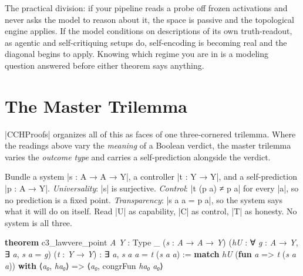 \documentclass{memoir}
\begin{document}
The practical division: if your pipeline reads a probe off frozen activations
and never asks the model to reason about it, the space is passive and the
topological engine applies. If the model conditions on descriptions of its own
truth-readout, as agentic and self-critiquing setups do, self-encoding is
becoming real and the diagonal begins to apply. Knowing which regime you are in
is a modeling question answered before either theorem says anything.



\section{The Master Trilemma}\label{Two--Schemas--of--Impossibility-005F-005F-005F--Machine--Checked--Limits--of--Trustworthy--Machine--Learning-005F-005F-005F--and--Why--They--Tighten--with--Capability----Three--Trilemmata-005F-005F-005F--One--Theorem----The--Master--Trilemma}

\LeanVerb|CCHProofs| organizes all of this as faces of one three-cornered trilemma. Where
the readings above vary the \emph{meaning} of a Boolean verdict, the master trilemma
varies the \emph{outcome type} and carries a self-prediction alongside the verdict.

Bundle a system \LeanVerb|s : A → A → Y|, a controller \LeanVerb|t : Y → Y|, and a self-prediction
\LeanVerb|p : A → Y|. \emph{Universality}: \LeanVerb|s| is surjective. \emph{Control}: \LeanVerb|t (p a) ≠ p a| for
every \LeanVerb|a|, so no prediction is a fixed point. \emph{Transparency}: \LeanVerb|s a a = p a|, so
the system says what it will do on itself. Read \LeanVerb|U| as capability, \LeanVerb|C| as
control, \LeanVerb|T| as honesty. No system is all three.

\begin{LeanVerbatim}
\textbf{theorem} c3_lawvere_point \textit{A} \textit{Y} : Type _ (\textit{s} : \textit{A} → \textit{A} → \textit{Y})
    (\textit{hU} : ∀ \textit{g} : \textit{A} → \textit{Y}, ∃ \textit{a}, \textit{s} \textit{a} = \textit{g}) (\textit{t} : \textit{Y} → \textit{Y}) :
    ∃ \textit{a}, \textit{s} \textit{a} \textit{a} = \textit{t} (\textit{s} \textit{a} \textit{a}) :=
  \textbf{match} \textit{hU} (\textbf{fun} \textit{a} => \textit{t} (\textit{s} \textit{a} \textit{a})) \textbf{with}
   ⟨\textit{a₀}, \textit{ha₀}⟩ => ⟨\textit{a₀}, congrFun \textit{ha₀} \textit{a₀}⟩

\end{LeanVerbatim}
\end{document}
